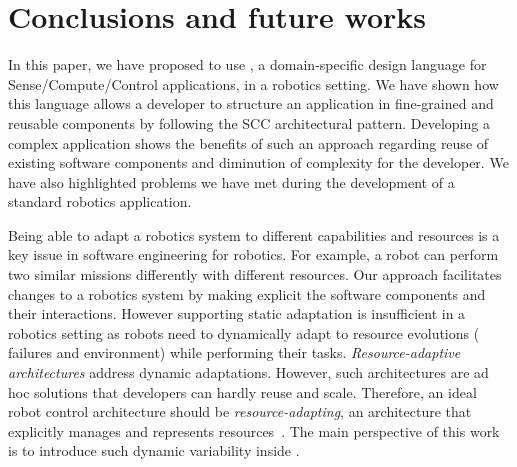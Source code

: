 
\section{Conclusions and future works}
\label{sec:conclusion}

In this paper, we have proposed to use \diaspec{}, a domain-specific
design language for Sense/Compute/Control applications, in a robotics
setting. We have shown how this language allows a developer to
structure an application in fine-grained and reusable components by
following the SCC architectural pattern. Developing a complex
application shows the benefits of such an approach regarding reuse of
existing software components and diminution of complexity for the
developer. We have also highlighted  problems we have met
during the development of a standard robotics application.

Being able to adapt a robotics system to different capabilities and
resources is a key issue in software engineering for robotics. For
example, a robot can perform two similar missions differently with
different resources. Our approach facilitates changes to a robotics
system by making explicit the software components and their
interactions. However supporting static adaptation is insufficient in
a robotics setting as robots need to dynamically adapt to resource
evolutions (\eg{} failures and environment) while performing their
tasks. \emph{Resource-adaptive architectures} address dynamic
adaptations. However, such architectures are ad hoc solutions that
developers can hardly reuse and scale. Therefore, an ideal robot
control architecture should be \emph{resource-adapting}, \ie{} an
architecture that explicitly manages and represents
resources~\cite{Bour07a}. The main perspective of this work is to
introduce such dynamic variability inside \diaspec{}.
